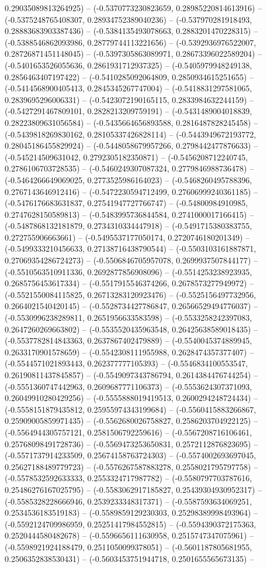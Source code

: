 0.29035089813264925) -- (-0.5370773230823659, 0.28985220814613916) -- (-0.5375248765408307, 0.28934752389040236) -- (-0.537970281918493, 0.28883683903387436) -- (-0.5384135493078663, 0.2883201470228315) -- (-0.5388546862093986, 0.28779744113221656) -- (-0.5392936976522007, 0.28726871451148045) -- (-0.5397305863089971, 0.28673396022589204) -- (-0.5401653526055636, 0.2861931712937325) -- (-0.5405979948249138, 0.2856463407197422) -- (-0.5410285092064809, 0.2850934615251655) -- (-0.5414568900405413, 0.2845345267747004) -- (-0.5418831297581065, 0.2839695296006331) -- (-0.5423072190165115, 0.2833984632244159) -- (-0.5427291467809101, 0.2828213209759191) -- (-0.5431489004018839, 0.28223809631056584) -- (-0.5435664656893588, 0.2816487828245458) -- (-0.5439818269830162, 0.28105337426828114) -- (-0.5443949672193772, 0.28045186455829924) -- (-0.5448058679957266, 0.2798442477876633) -- (-0.545214509631042, 0.2792305182350871) -- (-0.5456208712240745, 0.2786106703728535) -- (-0.5460249307087324, 0.2779846988736478) -- (-0.5464266649069025, 0.2773525986164023) -- (-0.5468260495788396, 0.2767143646912416) -- (-0.5472230594712499, 0.27606999240361185) -- (-0.5476176683631837, 0.27541947727766747) -- (-0.54800984910985, 0.2747628150589813) -- (-0.5483995736844584, 0.2741000017166415) -- (-0.5487868132181879, 0.2734310334447918) -- (-0.5491715380383755, 0.272755906663661) -- (-0.5495537177050174, 0.2720746180201349) -- (-0.5499333210456633, 0.27138716438790544) -- (-0.5503103161887871, 0.27069354286724273) -- (-0.5506846705957078, 0.2699937507844177) -- (-0.5510563510911336, 0.2692877856908096) -- (-0.5514253238923935, 0.2685756453617334) -- (-0.5517915546374266, 0.2678573277949972) -- (-0.5521550084115825, 0.26713283120923476) -- (-0.5525156497732956, 0.2664021540420145) -- (-0.5528734427786847, 0.26566529494776037) -- (-0.5530996238289811, 0.2651956633583598) -- (-0.5533258242397083, 0.2647260269663802) -- (-0.5535520435963548, 0.26425638589018435) -- (-0.5537782814843363, 0.2637867402479889) -- (-0.5540045374889945, 0.2633170901578659) -- (-0.5542308111955988, 0.2628474357377407) -- (-0.5544571021893443, 0.262377777105393) -- (-0.5546834100553547, 0.26190811437845857) -- (-0.5549097343786794, 0.2614384476744254) -- (-0.5551360747442963, 0.2609687771106373) -- (-0.5553624307371093, 0.26049910280429256) -- (-0.5555888019419513, 0.2600294248724434) -- (-0.5558151879435812, 0.25955974343199684) -- (-0.5560415883266867, 0.25909005859971435) -- (-0.5562680026758827, 0.2586203704922125) -- (-0.5564944305757121, 0.2581506792259616) -- (-0.5567208716106461, 0.25768098491728736) -- (-0.5569473253650831, 0.2572112876823695) -- (-0.5571737914233509, 0.25674158763724303) -- (-0.5574002693697045, 0.25627188489779723) -- (-0.5576267587883278, 0.2558021795797758) -- (-0.5578532592633333, 0.2553324717987782) -- (-0.5580797703787616, 0.25486276167025795) -- (-0.5583062917185827, 0.25439304930952317) -- (-0.5585328228666946, 0.2539233348317371) -- (-0.5587593634069251, 0.2534536183519183) -- (-0.5589859129230303, 0.25298389998493964) -- (-0.5592124709986959, 0.25251417984552815) -- (-0.5594390372175363, 0.2520444580482678) -- (-0.5596656111630958, 0.2515747347075961) -- (-0.5598921924188479, 0.2511050099378051) -- (-0.5601187805681955, 0.2506352838530431) -- (-0.5603453751944718, 0.2501655565673135) -- 